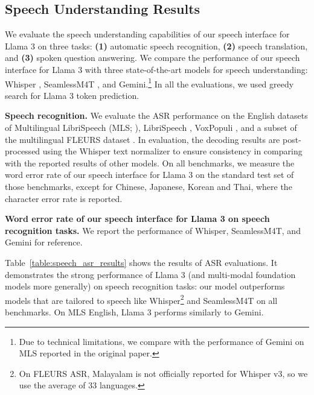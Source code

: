

\subsection{Speech Understanding Results}
\label{section:results_speech}
We evaluate the speech understanding capabilities of our speech interface for Llama 3 on three tasks: \textbf{(1)} automatic speech recognition, \textbf{(2)} speech translation, and \textbf{(3)} spoken question answering.
We compare the performance of our speech interface for Llama 3 with three state-of-the-art models for speech understanding: Whisper \citep{radford23whisper}, SeamlessM4T \citep{barrault2023seamless}, and Gemini.\footnote{
	Due to technical limitations, we compare with the performance of Gemini on MLS reported in the original paper.
}
In all the evaluations, we used greedy search for Llama 3 token prediction.

\textbf{Speech recognition.}
We evaluate the ASR performance on the
English datasets of
Multilingual LibriSpeech (MLS; \citet{pratap2020mls}),
LibriSpeech \citep{panayotov2015librispeech},
VoxPopuli \citep{wang2021voxpopuli},
and a subset of the multilingual FLEURS dataset \citep{conneau2023fleurs}.
In evaluation, the decoding results are post-processed using the Whisper text normalizer to ensure consistency in comparing with the reported results of other models.
On all benchmarks, we measure the word error rate of our speech interface for Llama 3 on the standard test set of those benchmarks, except for Chinese, Japanese, Korean and Thai, where the character error rate is reported.



\providecommand{\bup}{($\boldsymbol\uparrow$)}
\providecommand{\bdown}{($\boldsymbol\downarrow$)}


\begin{table}[t]
	\centering
	 \resizebox{\linewidth}{!}{}
	\caption{\textbf{Word error rate of our speech interface for Llama 3 on speech recognition tasks.} We report the performance of Whisper, SeamlessM4T, and Gemini for reference.}
	\label{table:speech_asr_results}
\end{table}


Table~\ref{table:speech_asr_results} shows the results of ASR evaluations.
It demonstrates the strong performance of Llama 3 (and multi-modal foundation models more generally) on speech recognition tasks: our model outperforms models that are tailored to speech like Whisper\footnote{On FLEURS ASR, Malayalam is not officially reported for Whisper v3, so we use the average of 33 languages.} and SeamlessM4T on all benchmarks.
On MLS English, Llama 3 performs similarly to Gemini.


